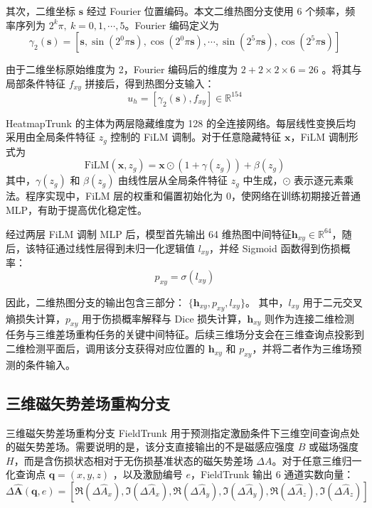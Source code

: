 其次，二维坐标 $\mathbf s$ 经过 Fourier 位置编码\citep{tancik2020fourier}。本文二维热图分支使用 6 个频率，频率序列为 $2^k\pi,\ k=0,1,\cdots,5$。Fourier 编码定义为
\begin{equation}
\label{eq:fourier_2d}
\gamma_2(\mathbf s)
=
[
\mathbf s,
\sin(2^0\pi\mathbf s),
\cos(2^0\pi\mathbf s),
\cdots,
\sin(2^5\pi\mathbf s),
\cos(2^5\pi\mathbf s)
]
\end{equation}

由于二维坐标原始维度为 2，Fourier 编码后的维度为
$
2+2\times2\times6=26
$
。将其与局部条件特征 $f_{xy}$ 拼接后，得到热图分支输入：
\begin{equation}
\label{eq:heatmap_input}
u_h
=
[\gamma_2(\mathbf s),f_{xy}]
\in\mathbb{R}^{154}
\end{equation}

HeatmapTrunk 的主体为两层隐藏维度为 128 的全连接网络。每层线性变换后均采用由全局条件特征 $z_g$ 控制的 FiLM 调制\citep{perez2018film}。对于任意隐藏特征 $\mathbf x$，FiLM 调制形式为
\begin{equation}
\label{eq:film}
\mathrm{FiLM}(\mathbf x,z_g)
=
\mathbf x\odot
\left(
1+\gamma(z_g)
\right)
+
\beta(z_g)
\end{equation}
其中，$\gamma(z_g)$ 和 $\beta(z_g)$ 由线性层从全局条件特征 $z_g$ 中生成，$\odot$ 表示逐元素乘法。程序实现中，FiLM 层的权重和偏置初始化为 0，使网络在训练初期接近普通 MLP，有助于提高优化稳定性。

经过两层 FiLM 调制 MLP 后，模型首先输出 64 维热图中间特征$\mathbf h_{xy}\in\mathbb{R}^{64}$，随后，该特征通过线性层得到未归一化逻辑值 $l_{xy}$，并经 Sigmoid 函数得到伤损概率：
\begin{equation}
\label{eq:heat_prob}
p_{xy}
=
\sigma(l_{xy})
\end{equation}

因此，二维热图分支的输出包含三部分：
$
\{\mathbf h_{xy},p_{xy},l_{xy}\}
$。
其中，$l_{xy}$ 用于二元交叉熵损失计算，$p_{xy}$ 用于伤损概率解释与 Dice 损失计算\citep{milletari2016v}，$\mathbf h_{xy}$ 则作为连接二维检测任务与三维差场重构任务的关键中间特征。后续三维场分支会在三维查询点投影到二维检测平面后，调用该分支获得对应位置的 $\mathbf h_{xy}$ 和 $p_{xy}$，并将二者作为三维场预测的条件输入。

\subsection{三维磁矢势差场重构分支}
\label{subsec:field_trunk}

三维磁矢势差场重构分支 FieldTrunk 用于预测指定激励条件下三维空间查询点处的磁矢势差场。需要说明的是，该分支直接输出的不是磁感应强度 $B$ 或磁场强度 $H$，而是含伤损状态相对于无伤损基准状态的磁矢势差场 $\Delta A$。对于任意三维归一化查询点
$
\mathbf q=(x,y,z)
$
，以及激励编号 $e$，FieldTrunk 输出 6 通道实数向量：
\begin{equation}
\label{eq:field_output_channels}
\Delta \hat{\mathbf A}(\mathbf q,e)
=
[
\Re(\Delta \hat A_x),
\Im(\Delta \hat A_x),
\Re(\Delta \hat A_y),
\Im(\Delta \hat A_y),
\Re(\Delta \hat A_z),
\Im(\Delta \hat A_z)
]
\end{equation}


